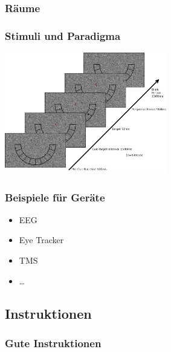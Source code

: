 \documentclass[
]{book}
\begin{document}
\hypertarget{ruxe4ume}{%
\subsubsection{Räume}\label{ruxe4ume}}

\hypertarget{stimuli-und-paradigma}{%
\subsubsection{Stimuli und Paradigma}\label{stimuli-und-paradigma}}

\begin{center}\includegraphics[width=200pt]{imgs/Ablauf} \end{center}

\hypertarget{beispiele-fuxfcr-geruxe4te}{%
\subsubsection{Beispiele für Geräte}\label{beispiele-fuxfcr-geruxe4te}}

\begin{itemize}
\item
  EEG
\item
  Eye Tracker
\item
  TMS
\item
  \ldots{}
\end{itemize}

\hypertarget{instruktionen}{%
\subsection{Instruktionen}\label{instruktionen}}

\hypertarget{gute-instruktionen}{%
\subsubsection{Gute Instruktionen}\label{gute-instruktionen}}
\end{document}
